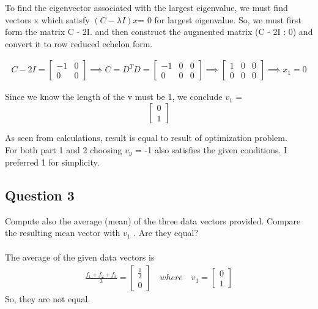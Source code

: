 \documentclass{article}
\begin{document}
To find the eigenvector associated with the largest eigenvalue, we must find vectors x which satisfy $(C - \lambda I)x $= 0 for largest eigenvalue.
So, we must first form the matrix C - 2I. and then construct the augmented matrix (C - 2I : 0) and convert it to row reduced echelon form.

\begin{gather*}
C - 2I = \begin{bmatrix}-1&0\\0&0\end{bmatrix} \implies C = D^T D = \begin{bmatrix}-1&0&0\\0&0&0\end{bmatrix} \implies \begin{bmatrix}1&0&0\\0&0&0\end{bmatrix} \implies x_1 = 0
\end{gather*}

Since we know the length of the v must be 1, we conclude $v_1$ =  $$\begin{bmatrix}0\\1\end{bmatrix} $$

As seen from calculations, result is equal to result of optimization problem.
\\
 For both part 1 and 2 choosing $v_y$ = -1 also satisfies the given conditions. I preferred 1 for simplicity.

\subsection{Question 3}
Compute also the average (mean) of the three data vectors provided. Compare the resulting mean vector with $v_1$ . Are they equal? \\
\\
The average of the given data vectors is
\begin{gather*}
\frac{f_1 + f_2 + f_3}{3} = \begin{bmatrix}\frac{1}{3}\\0\end{bmatrix} \quad where \quad v_1 = \begin{bmatrix}0\\1\end{bmatrix}
\end{gather*}
So, they are not equal.
\end{document}
